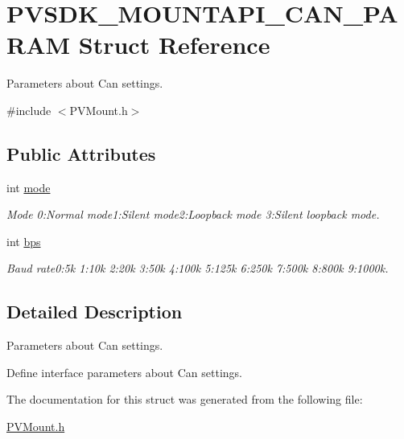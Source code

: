 \hypertarget{struct_p_v_s_d_k___m_o_u_n_t_a_p_i___c_a_n___p_a_r_a_m}{}\section{P\+V\+S\+D\+K\+\_\+\+M\+O\+U\+N\+T\+A\+P\+I\+\_\+\+C\+A\+N\+\_\+\+P\+A\+R\+AM Struct Reference}
\label{struct_p_v_s_d_k___m_o_u_n_t_a_p_i___c_a_n___p_a_r_a_m}


Parameters about Can settings.  




{\ttfamily \#include $<$P\+V\+Mount.\+h$>$}

\subsection*{Public Attributes}
\begin{DoxyCompactItemize}
\item 
\mbox{\label{struct_p_v_s_d_k___m_o_u_n_t_a_p_i___c_a_n___p_a_r_a_m_a92c34f96b9fbe047605a64879c3f8c23}} 
int \hyperlink{struct_p_v_s_d_k___m_o_u_n_t_a_p_i___c_a_n___p_a_r_a_m_a92c34f96b9fbe047605a64879c3f8c23}{mode}
\begin{DoxyCompactList}\small\item\em Mode 0\+:Normal mode1\+:Silent mode2\+:Loopback mode 3\+:Silent loopback mode. \end{DoxyCompactList}\item 
\mbox{\label{struct_p_v_s_d_k___m_o_u_n_t_a_p_i___c_a_n___p_a_r_a_m_ad5837447961182e1ba0b32f1b67ffbcc}} 
int \hyperlink{struct_p_v_s_d_k___m_o_u_n_t_a_p_i___c_a_n___p_a_r_a_m_ad5837447961182e1ba0b32f1b67ffbcc}{bps}
\begin{DoxyCompactList}\small\item\em Baud rate0\+:5k 1\+:10k 2\+:20k 3\+:50k 4\+:100k 5\+:125k 6\+:250k 7\+:500k 8\+:800k 9\+:1000k. \end{DoxyCompactList}\end{DoxyCompactItemize}


\subsection{Detailed Description}
Parameters about Can settings. 

Define interface parameters about Can settings. 

The documentation for this struct was generated from the following file\+:\begin{DoxyCompactItemize}
\item 
\hyperlink{_p_v_mount_8h}{P\+V\+Mount.\+h}\end{DoxyCompactItemize}
